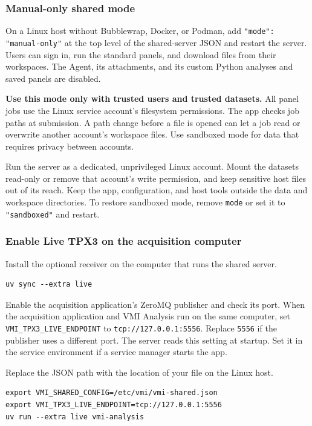 \documentclass[11pt,a4paper]{article}
\newcommand{\code}[1]{\texttt{#1}}
\begin{document}
\subsubsection{Manual-only shared mode}

On a Linux host without Bubblewrap, Docker, or Podman, add
\code{"mode": "manual-only"} at the top level of the shared-server JSON and
restart the server. Users can sign in, run the standard panels, and download
files from their workspaces. The Agent, its attachments, and its custom
Python analyses and saved panels are disabled.

\textbf{Use this mode only with trusted users and trusted datasets.}
All panel jobs use the Linux service account's filesystem permissions.
The app checks job paths at submission. A path change before a file is
opened can let a job read or overwrite another account's workspace files.
Use sandboxed mode for data that requires privacy between accounts.

Run the server as a dedicated, unprivileged Linux account. Mount the
datasets read-only or remove that account's write permission, and keep
sensitive host files out of its reach. Keep the app, configuration, and host
tools outside the data and workspace directories. To restore sandboxed
mode, remove \code{mode} or set it to \code{"sandboxed"} and restart.

\subsubsection{Enable Live TPX3 on the acquisition computer}
\label{sec:live-tpx3-shared}

Install the optional receiver on the computer that runs the shared server.
\begin{verbatim}
uv sync --extra live
\end{verbatim}

Enable the acquisition application's ZeroMQ publisher and check its port.
When the acquisition application and VMI Analysis run on the same computer,
set \code{VMI\_TPX3\_LIVE\_ENDPOINT} to \code{tcp://127.0.0.1:5556}.
Replace \code{5556} if the publisher uses a different port.
The server reads this setting at startup. Set it in the service environment
if a service manager starts the app.

Replace the JSON path with the location of your file on the Linux host.
\begin{verbatim}
export VMI_SHARED_CONFIG=/etc/vmi/vmi-shared.json
export VMI_TPX3_LIVE_ENDPOINT=tcp://127.0.0.1:5556
uv run --extra live vmi-analysis
\end{verbatim}
\end{document}
